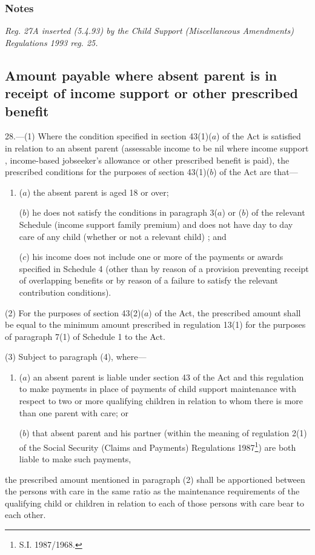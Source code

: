 \documentclass[a4paper]{article}
\newcommand\amendment[1]{\subsubsection*{Notes}{\itshape\frenchspacing\footnotesize #1 \par\goodbreak}}
\begin{document}
\amendment{
Reg. 27A inserted (5.4.93) by the Child Support (Miscellaneous Amendments) Regulations 1993 reg. 25.
}

\subsection[28. Amount payable where absent parent is in receipt of income support or other prescribed benefit]{Amount payable where absent parent is in receipt of income support or other prescribed benefit}

28.—(1) Where the condition specified in section 43(1)($a$) of the Act is satisfied in relation to an absent parent (assessable income to be nil where income support%
, income-based jobseeker’s allowance  %
 or other prescribed benefit is paid), the prescribed conditions for the purposes of section 43(1)($b$) of the Act are that—
\begin{enumerate}\item[]
($a$) the absent parent is aged 18 or over;

($b$) he does not satisfy the conditions in paragraph 
3($a$) or ($b$)  %
of the relevant Schedule (income support family premium)
and does not have day to day care of any child (whether or not a relevant child)%
; and

($c$) 
his income does not include %
one or more of the payments or awards specified in Schedule 4 (other than by reason of a provision preventing receipt of overlapping benefits or by reason of a failure to satisfy the relevant contribution conditions).
\end{enumerate}

(2) For the purposes of section 43(2)($a$) of the Act, the prescribed amount shall be equal to the minimum amount prescribed in regulation 13(1) for the purposes of paragraph 7(1) of Schedule 1 to the Act.

(3) Subject to paragraph (4), where—
\begin{enumerate}\item[]
($a$) an absent parent is liable under section 43 of the Act and this regulation to make payments in place of payments of child support maintenance with respect to two or more qualifying children in relation to whom there is more than one parent with care; or

($b$) that absent parent and his partner (within the meaning of regulation 2(1) of the Social Security (Claims and Payments) Regulations 1987\footnote{\frenchspacing S.I. 1987/1968.}) are both liable to make such payments,
\end{enumerate}
the prescribed amount mentioned in paragraph (2) shall be apportioned between the persons with care in the same ratio as the maintenance requirements of the qualifying child or children in relation to each of those persons with care bear to each other.
\end{document}
